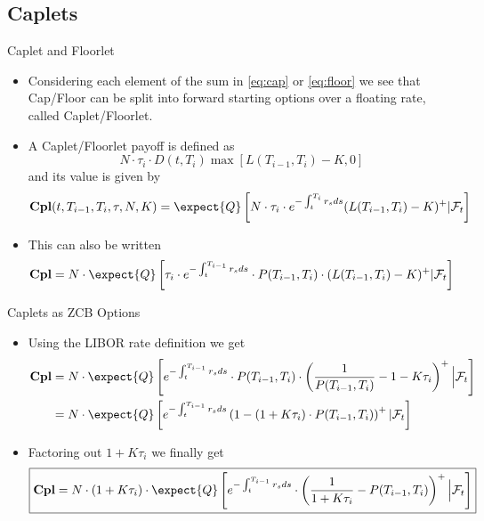 \documentclass{beamer}
\begin{document}
\subsection{Caplets}
\begin{frame}{Caplet and Floorlet}
	\begin{itemize}
		\item<1-> Considering each element of the sum in \cref{eq:cap} or \cref{eq:floor} we see that Cap/Floor can be split into forward starting options over a floating rate, called \textcolor{maincolor}{Caplet/Floorlet}.
		\item<2-> A Caplet/Floorlet payoff is defined as
		\begin{equation*}
			N\cdot\tau_i\cdot D(t,T_i)\max\left[L(T_{i-1},T_i)-K,0\right]
		\end{equation*}
		and its value is given by
		\begin{equation}
			\textbf{Cpl}(t,T_{i-1},T_i,\tau,N,K)=\expect{Q}\left[N\cdot\tau_i\cdot e^{-\int_t^{T_i}r_s ds}(L(T_{i-1},T_i)-K)^+ | \mathcal{F}_t\right]
		\end{equation}
		\item<3-> This can also be written
		\begin{equation*}
			\textbf{Cpl}=N\cdot\expect{Q}\left[\tau_i\cdot e^{-\int_t^{T_{i-1}}r_s ds}\cdot P(T_{i-1},T_i)\cdot  (L(T_{i-1},T_i)-K)^+ | \mathcal{F}_t\right]
		\end{equation*}
	\end{itemize}
\end{frame}

\begin{frame}{Caplets as ZCB Options}
	\begin{itemize}
		\item<1-> Using the LIBOR rate definition we get
		\begin{equation*}
			\begin{aligned}
				\textbf{Cpl} &=N\cdot\expect{Q}\left[e^{-\int_t^{T_{i-1}}r_s ds}\cdot P(T_{i-1},T_i)\cdot\left(\frac{1}{P(T_{i-1},T_i)}-1-K\tau_i\right)^+ \Big\rvert \mathcal{F}_t\right] \\
				& = N\cdot\expect{Q}\left[e^{-\int_t^{T_{i-1}}r_s ds}\left(1-(1+K\tau_i)\cdot P(T_{i-1},T_i)\right)^+ | \mathcal{F}_t\right]
			\end{aligned}
		\end{equation*}
		\item<2-> Factoring out $1+K\tau_i$ we finally get
		\begin{equation}
			\boxed{\textbf{Cpl}=N\cdot(1+K\tau_i)\cdot\expect{Q}\left[e^{-\int_t^{T_{i-1}}r_s ds}\cdot\left(\frac{1}{1+K\tau_i}-P(T_{i-1},T_i)\right)^+ \Big\rvert \mathcal{F}_t\right]}
		\end{equation}
	\end{itemize}
\end{frame}
\end{document}
